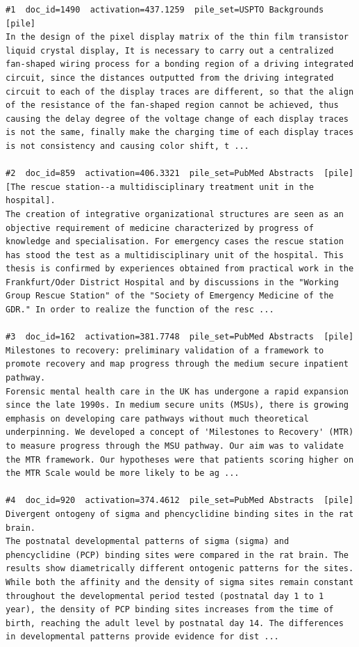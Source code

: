 \begin{verbatim}
#1  doc_id=1490  activation=437.1259  pile_set=USPTO Backgrounds  [pile]
In the design of the pixel display matrix of the thin film transistor liquid crystal display, It is necessary to carry out a centralized fan-shaped wiring process for a bonding region of a driving integrated circuit, since the distances outputted from the driving integrated circuit to each of the display traces are different, so that the align of the resistance of the fan-shaped region cannot be achieved, thus causing the delay degree of the voltage change of each display traces is not the same, finally make the charging time of each display traces is not consistency and causing color shift, t ...

#2  doc_id=859  activation=406.3321  pile_set=PubMed Abstracts  [pile]
[The rescue station--a multidisciplinary treatment unit in the hospital].
The creation of integrative organizational structures are seen as an objective requirement of medicine characterized by progress of knowledge and specialisation. For emergency cases the rescue station has stood the test as a multidisciplinary unit of the hospital. This thesis is confirmed by experiences obtained from practical work in the Frankfurt/Oder District Hospital and by discussions in the "Working Group Rescue Station" of the "Society of Emergency Medicine of the GDR." In order to realize the function of the resc ...

#3  doc_id=162  activation=381.7748  pile_set=PubMed Abstracts  [pile]
Milestones to recovery: preliminary validation of a framework to promote recovery and map progress through the medium secure inpatient pathway.
Forensic mental health care in the UK has undergone a rapid expansion since the late 1990s. In medium secure units (MSUs), there is growing emphasis on developing care pathways without much theoretical underpinning. We developed a concept of 'Milestones to Recovery' (MTR) to measure progress through the MSU pathway. Our aim was to validate the MTR framework. Our hypotheses were that patients scoring higher on the MTR Scale would be more likely to be ag ...

#4  doc_id=920  activation=374.4612  pile_set=PubMed Abstracts  [pile]
Divergent ontogeny of sigma and phencyclidine binding sites in the rat brain.
The postnatal developmental patterns of sigma (sigma) and phencyclidine (PCP) binding sites were compared in the rat brain. The results show diametrically different ontogenic patterns for the sites. While both the affinity and the density of sigma sites remain constant throughout the developmental period tested (postnatal day 1 to 1 year), the density of PCP binding sites increases from the time of birth, reaching the adult level by postnatal day 14. The differences in developmental patterns provide evidence for dist ...


\end{verbatim}
